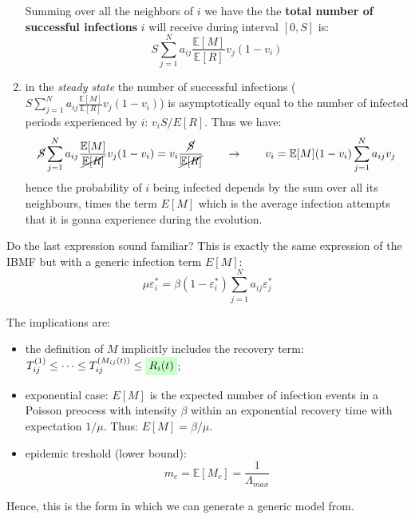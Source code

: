 \documentclass[../main/main.tex]{subfiles}
\begin{document}
\begin{enumerate}
Summing over all the neighbors of $i$ we have the the \textbf{total number of successful infections} \( i \) will receive during interval \( [0,S] \) is:
\begin{equation*}
  S \sum_{j=1}^{N}  a_{ij} \frac{\mathbb{E}[M]}{\mathbb{E}[R]} v_{j} (1-v_i)
\end{equation*}

\item in the \emph{steady state} the number of successful infections (\(  S \sum_{j=1}^{N}  a_{ij} \frac{\mathbb{E}[M]}{\mathbb{E}[R]} v_{j} (1-v_i) \)) is asymptotically equal to the number of infected periods experienced by \( i \): \( v_i S / E[R] \). Thus we have:
\begin{equation}
  \cancel{S} \sum_{j=1}^{N}  a_{ij} \frac{\mathbb{E}[M]}{\cancel{\mathbb{E}[R]}} v_{j} (1-v_i) = v_i \frac{\cancel{ S}}{\cancel{\mathbb{E}[R]}} \qquad \rightarrow \qquad  v_i = \mathbb{E}[M] (1- v_i) \sum_{j=1}^{N} a_{ij} v_j
\end{equation}
hence the probability of \( i \) being infected depends by the sum over all its neighbours, times the term \( E[M] \) which is the average infection attempts that it is gonna experience during the evolution.
\end{enumerate}

Do the last expression sound familiar? This is exactly the same expression of the IBMF but with a generic infection term \( E[M] \):
\begin{equation*}
  \mu \varepsilon _i^* = \beta ( 1 - \varepsilon _i^*) \sum_{j=1}^{N} a_{ij} \varepsilon _j^*
\end{equation*}

The implications are:
\begin{itemize}
\item the definition of \( M \) implicitly includes the recovery term: \( T_{ij}^{(1)} \le \dots \le T_{ij}^{(M_{ij}(t))} \le \mathcolorbox{green!20}{R_i (t)} \);
\item exponential case: \( E[M] \) is the expected number of infection events in a Poisson preocess with intensity \( \beta  \) within an exponential recovery time with expectation \( 1/ \mu  \). Thus: \( E[M] = \beta / \mu  \).
\item epidemic treshold (lower bound):
\begin{equation*}
  m_c = \mathbb{E}[M_c] = \frac{1}{\Lambda _{max}}
\end{equation*}
\end{itemize}
Hence, this is the form in which we can generate a generic model from.
\end{document}
